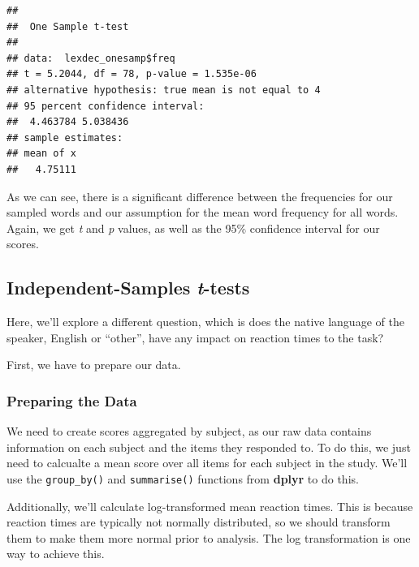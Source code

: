 \documentclass[
]{book}
\newenvironment{Shaded}{\begin{snugshade}}{\end{snugshade}}
\newcommand{\AttributeTok}[1]{\textcolor[rgb]{0.77,0.63,0.00}{#1}}
\newcommand{\DecValTok}[1]{\textcolor[rgb]{0.00,0.00,0.81}{#1}}
\newcommand{\FunctionTok}[1]{\textcolor[rgb]{0.00,0.00,0.00}{#1}}
\newcommand{\NormalTok}[1]{#1}
\newcommand{\SpecialCharTok}[1]{\textcolor[rgb]{0.00,0.00,0.00}{#1}}
\begin{document}
\begin{Shaded}
\end{Shaded}

\begin{verbatim}
## 
##  One Sample t-test
## 
## data:  lexdec_onesamp$freq
## t = 5.2044, df = 78, p-value = 1.535e-06
## alternative hypothesis: true mean is not equal to 4
## 95 percent confidence interval:
##  4.463784 5.038436
## sample estimates:
## mean of x 
##   4.75111
\end{verbatim}

As we can see, there is a significant difference between the frequencies for our sampled words and our assumption for the mean word frequency for all words. Again, we get \emph{t} and \emph{p} values, as well as the 95\% confidence interval for our scores.

\hypertarget{independent-samples-t-tests}{%
\subsection{\texorpdfstring{Independent-Samples \emph{t}-tests}{Independent-Samples t-tests}}\label{independent-samples-t-tests}}

Here, we'll explore a different question, which is does the native language of the speaker, English or ``other'', have any impact on reaction times to the task?

First, we have to prepare our data.

\hypertarget{preparing-the-data-1}{%
\subsubsection{Preparing the Data}\label{preparing-the-data-1}}

We need to create scores aggregated by subject, as our raw data contains information on each subject and the items they responded to. To do this, we just need to calcualte a mean score over all items for each subject in the study. We'll use the \texttt{group\_by()} and \texttt{summarise()} functions from \textbf{dplyr} to do this.

Additionally, we'll calculate log-transformed mean reaction times. This is because reaction times are typically not normally distributed, so we should transform them to make them more normal prior to analysis. The log transformation is one way to achieve this.
\end{document}
